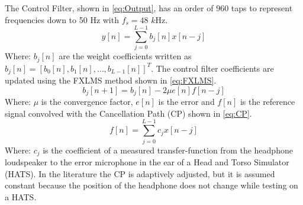The Control Filter, shown in \autoref{eq:Output}, has an order of 960 taps to represent frequencies down to 50 Hz with $f_s = 48$ $k$Hz. 
\begin{equation}\label{eq:Output}
y[n]=\sum_{j=0}^{L-1}b_j[n]x[n-j]
\end{equation}
Where: $b_j[n]$ are the weight coefficients written as  $b_j[n]=[b_0[n],b_1[n], \dotsc, b_{L-1}[n]]^T$. The control filter coefficients are updated using the FXLMS method shown in \autoref{eq:FXLMS}.
\begin{equation}\label{eq:FXLMS}
b_j[n+1] = b_j[n] - 2\mu e[n]f[n-j]
\end{equation}
Where: $\mu$ is the convergence factor, $e[n]$ is the error and $f[n]$ is the reference signal convolved with the Cancellation Path (CP) shown in \autoref{eq:CP}.
\begin{equation}\label{eq:CP}
f[n]=\sum_{j=0}^{L-1}c_jx[n-j]
\end{equation}
Where: $c_j$ is the coefficient of a measured transfer-function from the headphone loudspeaker to the error microphone in the ear of a Head and Torso Simulator (HATS). In the literature \cite{Hansen} the CP is adaptively adjusted, but it is assumed constant because the position of the headphone does not change while testing on a HATS. 


